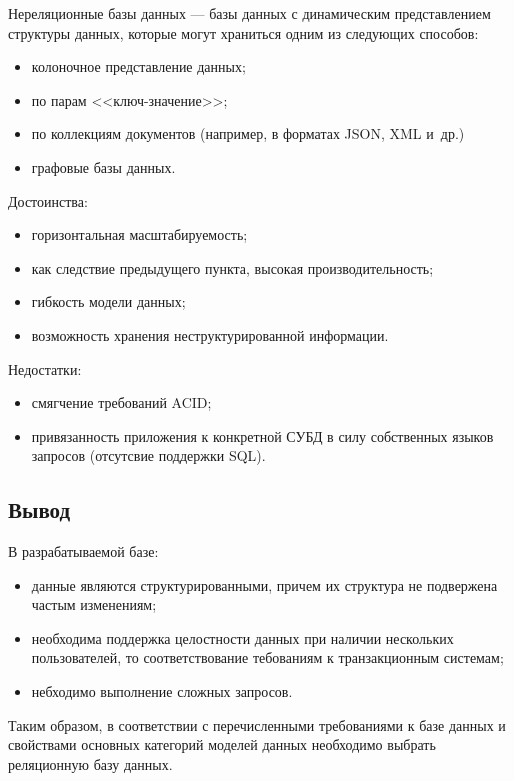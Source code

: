 Нереляционные базы данных --- базы данных с динамическим представлением
структуры данных, которые могут храниться одним из следующих способов:
\begin{itemize}
    \item колоночное представление данных;
    \item по парам <<ключ-значение>>;
    \item по коллекциям документов (например, в форматах JSON, XML и~др.)
    \item графовые базы данных.
\end{itemize}

Достоинства:
\begin{itemize}
    \item горизонтальная масштабируемость;
    \item как следствие предыдущего пункта, высокая производительность;
    \item гибкость модели данных;
    \item возможность хранения неструктурированной информации.
\end{itemize}

Недостатки:
\begin{itemize}
    \item смягчение требований ACID;
    \item привязанность приложения к конкретной СУБД в силу собственных
        языков запросов (отсутсвие поддержки SQL).
\end{itemize}

\subsection*{Вывод}

В разрабатываемой базе:

\begin{itemize}
    \item данные являются структурированными, причем их структура не подвержена
        частым изменениям;
    \item необходима поддержка целостности данных при наличии нескольких
        пользователей, то соответствование тебованиям к транзакционным системам;
    \item небходимо выполнение сложных запросов.
\end{itemize}

Таким образом, в соответствии с перечисленными требованиями к базе данных и
свойствами основных категорий моделей данных необходимо выбрать реляционную
базу данных.

